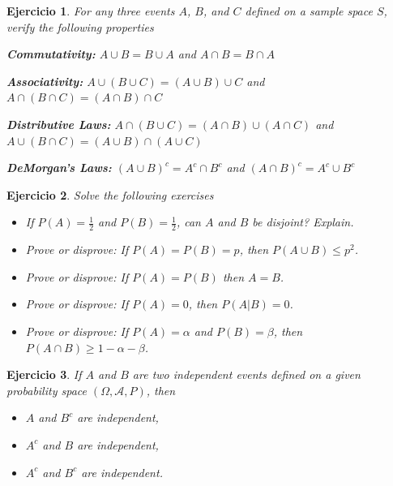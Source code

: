 \documentclass[12pt,twoside]{article}
\newtheorem{Ejer}{Ejercicio}
\begin{document}
\begin{Ejer} For any three events $A$, $B$, and $C$ defined on a sample space $S$, verify the following properties 

\textbf{Commutativity:} $A \cup B = B \cup A$ and $A \cap B = B \cap A$

\textbf{Associativity:} $A \cup (B \cup C) = (A \cup B) \cup C$ and $A \cap (B \cap C) = (A \cap B) \cap C$

\textbf{Distributive Laws:} $A \cap (B \cup C) = (A \cap B) \cup (A \cap C)$ and $A \cup (B \cap C) = (A \cup B) \cap (A \cup C)$

\textbf{DeMorgan's Laws:} $(A \cup B)^c = A^c \cap B^c$ and $(A \cap B)^c = A^c \cup B^c$
\end{Ejer}


\begin{Ejer}
Solve the following exercises
\begin{itemize}

\item[a) ] If $P(A)=\tfrac12$ and $P(B)=\tfrac12$, can $A$ and $B$ be disjoint? Explain.

\item[b) ] Prove or disprove: If $P(A)=P(B)=p$, then $P(A\cup B)\le p^2$.

\item[c) ] Prove or disprove: If $P(A)=P(B)$ then $A=B$.

\item[d) ] Prove or disprove: If $P(A)=0$, then $P(A|B)=0$.

\item[e) ] Prove or disprove: If $P(A)=\alpha$ and $P(B)=\beta$, then $P(A\cap B)\ge 1-\alpha-\beta$.

\end{itemize}
\end{Ejer}

\begin{Ejer} If $A$ and $B$ are two independent events defined on a given probability space $(\Omega,\mathcal{A},P)$, then

\begin{itemize}

\item[a) ] $A$ and $B^{c}$ are independent,

\item[b) ] $A^{c}$ and $B$ are independent,

\item[c) ] $A^{c}$ and $B^{c}$ are independent.

\end{itemize}
\end{Ejer}
\end{document}
